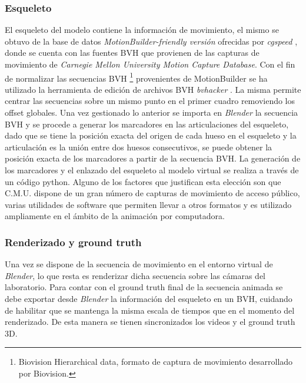 

\subsubsection{Esqueleto}
El esqueleto del modelo contiene la información de movimiento, el mismo se obtuvo de la base de datos \textit{MotionBuilder-friendly versión} ofrecidas por \textit{cgspeed} \cite{cgspeed}, 
 donde se cuenta con las fuentes BVH que provienen de las capturas de movimiento de \textit{Carnegie Mellon University Motion Capture Database}.       
 Con el fin de normalizar las secuencias BVH \footnote{Biovision Hierarchical data, formato de captura de movimiento desarrollado por Biovision.} provenientes de MotionBuilder se ha utilizado la herramienta de edición de archivos BVH \textit{bvhacker} \cite{bvhacker}.
 La misma permite centrar las secuencias sobre un mismo punto en el primer cuadro removiendo los offset globales.
 Una vez gestionado lo anterior se importa en \textit{Blender} la secuencia BVH y se procede a generar los marcadores en las articulaciones del esqueleto, dado que se tiene la posición exacta del origen de cada hueso en el esqueleto y la articulación es la unión entre dos huesos consecutivos, se puede obtener la posición exacta de los marcadores a partir de la secuencia BVH.
 La generación de los marcadores y el enlazado del esqueleto al modelo virtual se realiza a través de un código python.
 Alguno de los factores que justifican esta elección son que C.M.U. dispone de un gran número de capturas de movimiento de acceso público, varias utilidades de software que permiten llevar a otros formatos y es utilizado ampliamente en el ámbito de la animación por computadora.
 
 \subsubsection{Renderizado y ground truth}
 Una vez se dispone de la secuencia de movimiento en el entorno virtual de \textit{Blender}, lo que resta es renderizar dicha secuencia sobre las cámaras del laboratorio. Para contar con el ground truth final de la secuencia animada se debe exportar desde \textit{Blender} la información del esqueleto en un BVH, cuidando de habilitar que se mantenga la misma escala de tiempos que en el momento del renderizado. De esta manera se tienen sincronizados los videos y el ground truth 3D.
 
